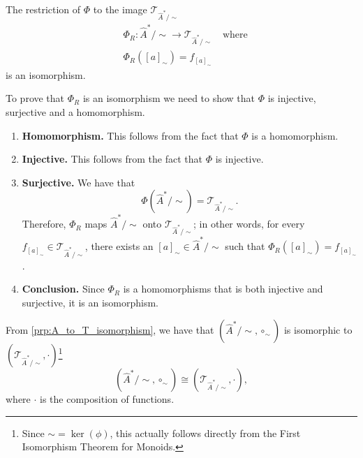 \begin{propositionE}
\label{prp:A_to_T_isomorphism}
    The restriction of $\Phi$ to the image $\mathcal{T}_{\hat{A}^{\ast}/\sim}$
    \begin{equation}
    \begin{aligned}
        & \Phi_{R} : \hat{A}^{\ast}/\sim \to \mathcal{T}_{\hat{A}^{\ast}/\sim} \quad \text{where} \\
        & \Phi_{R}([a]_{\sim}) = f_{[a]_{\sim}}
    \end{aligned}
    \end{equation}
    is an isomorphism.
\end{propositionE}
\begin{proofE}
    To prove that $\Phi_{R}$ is an isomorphism we need to show that $\Phi$ is injective, surjective and a homomorphism.
    \begin{enumerate}
    \item \textbf{Homomorphism.}
    This follows from the fact that $\Phi$ is a homomorphism.
    
    \item \textbf{Injective.}
    This follows from the fact that $\Phi$ is injective.
    
    \item \textbf{Surjective.}
    We have that
    \begin{equation}
        \Phi(\hat{A}^{\ast}/\sim) = \mathcal{T}_{\hat{A}^{\ast}/\sim}.
    \end{equation}
    Therefore, $\Phi_{R}$ maps $\hat{A}^{\ast}/\sim$ onto $\mathcal{T}_{\hat{A}^{\ast}/\sim}$; in other words, for every $f_{[a]_{\sim}} \in \mathcal{T}_{\hat{A}^{\ast}/\sim}$, there exists an $[a]_{\sim} \in \hat{A}^{\ast}/\sim$ such that $\Phi_{R}([a]_{\sim}) = f_{[a]_{\sim}}$.

    \item \textbf{Conclusion.}
    Since $\Phi_{R}$ is a homomorphisms that is both injective and surjective, it is an isomorphism.
\end{enumerate}
\end{proofE}

From \cref{prp:A_to_T_isomorphism}, we have that $(\hat{A}^{\ast}/\sim, \circ_{\sim})$ is isomorphic to $(\mathcal{T}_{\hat{A}^{\ast}/\sim}, \cdot)$\footnote{
    Since $\sim = \operatorname{ker}(\phi)$, this actually follows directly from the First Isomorphism Theorem for Monoids.
}
\begin{equation}
    (\hat{A}^{\ast}/\sim, \circ_{\sim}) \cong (\mathcal{T}_{\hat{A}^{\ast}/\sim}, \cdot),
\end{equation}
where $\cdot$ is the composition of functions.


